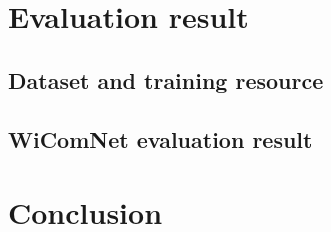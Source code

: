 \documentclass[journal]{IEEEtran} %
\begin{document}
\section{Evaluation result}
\subsection{Dataset and training resource}

\subsection{WiComNet evaluation result}

\section{Conclusion}





\end{document}
